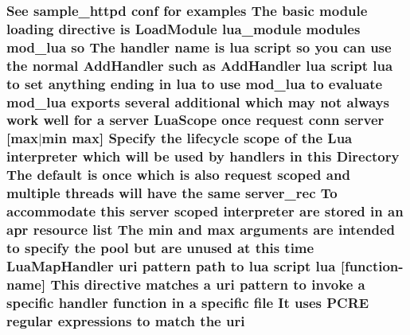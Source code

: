 \subsubsection[{\texorpdfstring{uri}{uri}}]{\setlength{\rightskip}{0pt plus 5cm}See sample\+\_\+httpd {\bf conf} for examples The basic {\bf module} loading {\bf directive} {\bf is} Load\+Module {\bf lua\+\_\+module} modules mod\+\_\+lua {\bf so} The {\bf handler} {\bf name} {\bf is} lua {\bf script} {\bf so} you {\bf can} use the normal Add\+Handler such {\bf as} Add\+Handler lua {\bf script} lua {\bf to} {\bf set} anything ending {\bf in} lua {\bf to} use mod\+\_\+lua {\bf to} evaluate mod\+\_\+lua exports several additional {\bf which} may {\bf not} always work well for {\bf a} {\bf server} Lua\+Scope {\bf once} {\bf request} {\bf conn} {\bf server} \mbox{[}{\bf max}$\vert${\bf min} {\bf max}\mbox{]} Specify the lifecycle scope {\bf of} the Lua interpreter {\bf which} will {\bf be} {\bf used} by handlers {\bf in} {\bf this} Directory The {\bf default} {\bf is} {\bf once} {\bf which} {\bf is} also {\bf request} scoped and multiple threads will have the same {\bf server\+\_\+rec} To accommodate {\bf this} {\bf server} scoped interpreter {\bf are} stored {\bf in} an apr {\bf resource} {\bf list} The {\bf min} and {\bf max} {\bf arguments} {\bf are} intended {\bf to} specify the {\bf pool} but {\bf are} unused at {\bf this} {\bf time} Lua\+Map\+Handler uri {\bf pattern} {\bf path} {\bf to} lua {\bf script} lua \mbox{[}{\bf function}-\/{\bf name}\mbox{]} This {\bf directive} {\bf matches} {\bf a} uri {\bf pattern} {\bf to} invoke {\bf a} specific {\bf handler} {\bf function} {\bf in} {\bf a} specific {\bf file} It uses {\bf P\+C\+RE} regular {\bf expressions} {\bf to} {\bf match} the uri}\hypertarget{basic-configuration_8txt_ada549f2ecc9adfe96fec66e2856cf49c}{}\label{basic-configuration_8txt_ada549f2ecc9adfe96fec66e2856cf49c}
